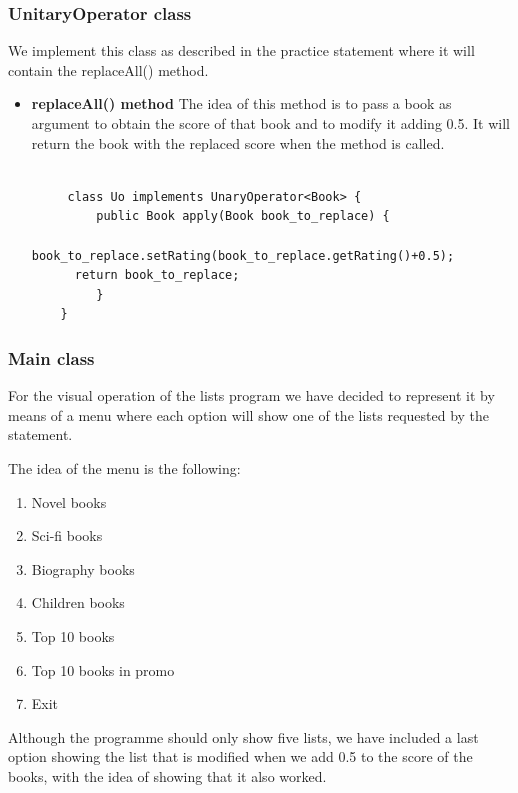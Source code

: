 \documentclass[a4paper]{article}
\theoremstyle{plain}
\theoremstyle{definition}
\begin{document}
	    
	    
	    
	    
	    
	    
	    
	    
	    
	    
	    
	    
	    
	    \subsubsection{UnitaryOperator class}
	        We implement this class as described in the practice statement where it will contain the replaceAll() method.
    \begin{itemize}
    \item \textbf{replaceAll() method}\newline
    The idea of this method is to pass a book as argument to obtain the score of that book and to modify it adding 0.5. It will return the book with the replaced score when the method is called.
     \begin{verbatim}
     
     class Uo implements UnaryOperator<Book> {
         public Book apply(Book book_to_replace) {
             book_to_replace.setRating(book_to_replace.getRating()+0.5);
      return book_to_replace;
         }
    }
     \end{verbatim}
\end{itemize}



	    \subsubsection{Main class}
	    For the visual operation of the lists program we have decided to represent it by means of a menu where each option will show one of the lists requested by the statement.\newline

        The idea of the menu is the following:\par
        \begin{enumerate}
            \item Novel books
            \item Sci-fi books
            \item Biography books
            \item Children books
            \item Top 10 books
            \item Top 10 books in promo
            \item Exit
        \end{enumerate}
    Although the programme should only show five lists, we have included a last option showing the list that is modified when we add 0.5 to the score of the books, with the idea of showing that it also worked.
    
\end{document}
